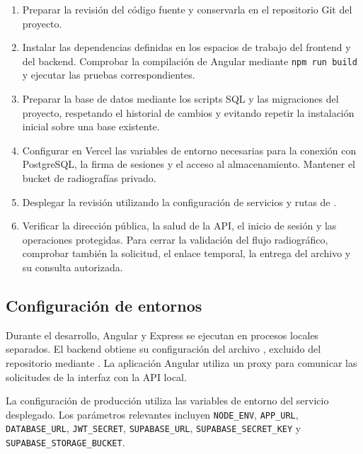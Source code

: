 \begin{enumerate}
    \item Preparar la revisión del código fuente y conservarla en el
    repositorio Git del proyecto.

    \item Instalar las dependencias definidas en los espacios de trabajo
    del frontend y del backend. Comprobar la compilación de Angular
    mediante \texttt{npm run build} y ejecutar las pruebas correspondientes.

    \item Preparar la base de datos mediante los scripts SQL y las
    migraciones del proyecto, respetando el historial de cambios
    y evitando repetir la instalación inicial sobre una base existente.

    \item Configurar en Vercel las variables de entorno necesarias
    para la conexión con PostgreSQL, la firma de sesiones y el acceso
    al almacenamiento. Mantener el bucket de radiografías privado.

    \item Desplegar la revisión utilizando la configuración de servicios
    y rutas de .

    \item Verificar la dirección pública, la salud de la API, el inicio
    de sesión y las operaciones protegidas. Para cerrar la validación
    del flujo radiográfico, comprobar también la solicitud, el enlace
    temporal, la entrega del archivo y su consulta autorizada.
\end{enumerate}

\subsection{Configuración de entornos}

Durante el desarrollo, Angular y Express se ejecutan en procesos locales
separados. El backend obtiene su configuración del archivo
, excluido del repositorio mediante
. La aplicación Angular utiliza un proxy para comunicar
las solicitudes de la interfaz con la API local.

La configuración de producción utiliza las variables de entorno del
servicio desplegado. Los parámetros relevantes incluyen
\texttt{NODE\_ENV}, \texttt{APP\_URL}, \texttt{DATABASE\_URL},
\texttt{JWT\_SECRET}, \texttt{SUPABASE\_URL},
\texttt{SUPABASE\_SECRET\_KEY} y
\texttt{SUPABASE\_STORAGE\_BUCKET}.

